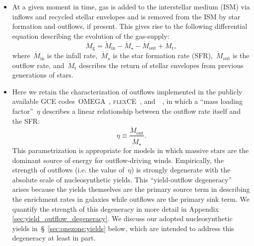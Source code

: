 \documentclass[ms.tex]{subfiles}
\begin{document}
\begin{itemize}

	\item At a given moment in time, gas is added to the interstellar medium
	(ISM) via inflows and recycled stellar envelopes and is removed from the
	ISM by star formation and outflows, if present.
	This gives rise to the following differential equation describing the
	evolution of the gas-supply:
	\begin{equation}
	\label{eq:mdot_gas}
	\dot{M}_\text{g} = \dot{M}_\text{in} - \dot{M}_\star - \dot{M}_\text{out}
	+ \dot{M}_\text{r},
	\end{equation}
	where~$\dot{M}_\text{in}$ is the infall rate,~$\dot{M}_\star$ is the star
	formation rate (SFR),~$\dot{M}_\text{out}$ is the outflow rate,
	and~$\dot{M}_\text{r}$ describes the return of stellar envelopes from
	previous generations of stars.

	\item Here we retain the characterization of outflows implemented in the
	publicly available GCE codes~\textsc{OMEGA}~\citep{Cote2017},
	\textsc{flexCE}~\citep{Andrews2017}, and~\vice~\citep{Johnson2020}, in
	which a ``mass loading factor''~$\eta$ describes a linear relationship
	between the outflow rate itself and the SFR:
	\begin{equation}
	\eta \equiv \frac{\dot{M}_\text{out}}{\dot{M}_\star}.
	\label{eq:mass_loading}
	\end{equation}
	This parametrization is appropriate for models in which massive stars are
	the dominant source of energy for outflow-driving winds.
	Empirically, the strength of outflows (i.e. the value of~$\eta$) is
	strongly degenerate with the absolute scale of nucleosynthetic yields.
	This ``yield-outflow degeneracy'' arises because the yields themselves are
	the primary source term in describing the enrichment rates in galaxies
	while outflows are the primary sink term.
	We quantify the strength of this degeneracy in more detail in Appendix
	\ref{sec:yield_outflow_degeneracy}.
	We discuss our adopted nucleosynthetic yields in~\S~\ref{sec:onezone:yields}
	below, which are intended to address this degeneracy at least in part.


\end{itemize}
\end{document}
